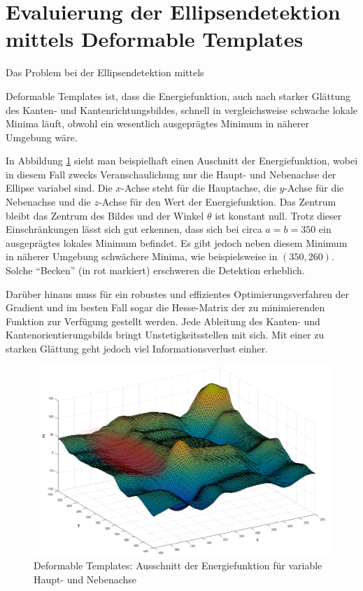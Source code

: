 \section{Evaluierung der Ellipsendetektion mittels Deformable Templates}
Das Problem bei der Ellipsendetektion mittels {Deformable Templates ist, dass die Energiefunktion, auch nach starker Glättung des Kanten- und Kantenrichtungsbildes, schnell in vergleichsweise schwache lokale Minima läuft, obwohl ein wesentlich ausgeprägtes Minimum in näherer Umgebung wäre.

In Abbildung \ref{fig:deformable} sieht man beispielhaft einen Auschnitt der Energiefunktion, wobei in diesem Fall zwecks Veranschaulichung nur die Haupt- und Nebenachse der Ellipse variabel sind. 
Die $x$-Achse steht für die Hauptachse, die $y$-Achse für die Nebenachse und die $z$-Achse für den Wert der Energiefunktion.
Das Zentrum bleibt das Zentrum des Bildes und der Winkel $\theta$ ist konstant null. Trotz dieser Einschränkungen lässt sich gut erkennen, dass sich bei circa $a = b = 350$ ein ausgeprägtes lokales Minimum befindet. Es gibt jedoch neben diesem Minimum in näherer Umgebung schwächere Minima, wie beispielsweise in $(350, 260)$. Solche "`Becken"' (in rot markiert) erschweren die Detektion erheblich.

Darüber hinaus muss für ein robustes und effizientes Optimierungsverfahren der Gradient und im besten Fall sogar die Hesse-Matrix der zu minimierenden Funktion zur Verfügung gestellt werden.  Jede Ableitung des Kanten- und Kantenorientierungsbilds bringt Unstetigkeitsstellen mit sich. Mit einer zu starken Glättung geht jedoch viel Informationsverlust einher.

\begin{figure}[!htb]
	\centering
	\includegraphics[scale=.4]{images/deformableHighlighted.png}
	\caption{Deformable Templates: Ausschnitt der Energiefunktion für variable Haupt- und Nebenachse}
	\label{fig:deformable}
\end{figure}

}
